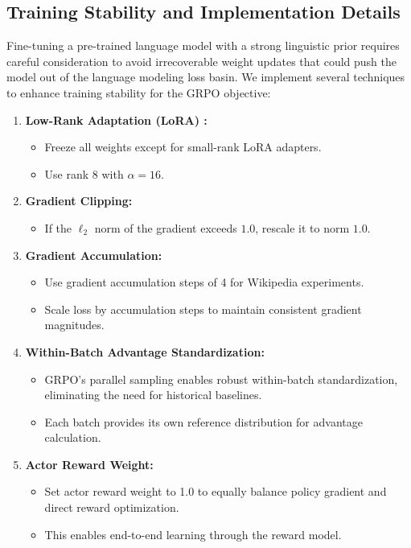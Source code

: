\documentclass[letterpaper]{article} %
\begin{document}
\subsection{Training Stability and Implementation Details}
\label{subsec:stability}
Fine-tuning a pre-trained language model with a strong linguistic prior requires careful consideration to avoid irrecoverable weight updates that could push the model out of the language modeling loss basin. We implement several techniques to enhance training stability for the GRPO objective:

\begin{enumerate}
    \item \textbf{Low-Rank Adaptation (LoRA) \citep{hu2022lora}:} 
    \begin{itemize}
        \item Freeze all weights except for small-rank LoRA adapters.
        \item Use rank 8 with $\alpha = 16$.
    \end{itemize}

    \item \textbf{Gradient Clipping:} 
    \begin{itemize}
        \item If the $\ell_2$ norm of the gradient exceeds $1.0$, rescale it to norm $1.0$.
    \end{itemize}

    \item \textbf{Gradient Accumulation:} 
    \begin{itemize}
        \item Use gradient accumulation steps of 4 for Wikipedia experiments.
        \item Scale loss by accumulation steps to maintain consistent gradient magnitudes.
    \end{itemize}

    \item \textbf{Within-Batch Advantage Standardization:} 
    \begin{itemize}
        \item GRPO's parallel sampling enables robust within-batch standardization, eliminating the need for historical baselines.
        \item Each batch provides its own reference distribution for advantage calculation.
    \end{itemize}

    \item \textbf{Actor Reward Weight:} 
    \begin{itemize}
        \item Set actor reward weight to 1.0 to equally balance policy gradient and direct reward optimization.
        \item This enables end-to-end learning through the reward model.
    \end{itemize}


\end{enumerate}
\end{document}
